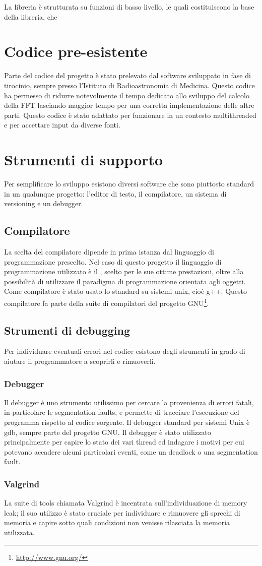 La libreria \`e strutturata su funzioni di basso livello, le quali costituiscono
la base della libreria, che 


\section{Codice pre-esistente}
Parte del codice del progetto \`e stato prelevato dal software sviluppato in
fase di tirocinio, sempre presso l'Istituto di Radioastronomia di Medicina.
Questo codice ha permesso di ridurre notevolmente il tempo dedicato allo
sviluppo del calcolo della \ac{FFT} lasciando maggior tempo per una corretta
implementazione delle altre parti. Questo codice \`e stato adattato per
funzionare in un contesto multithreaded e per accettare input da diverse fonti.

\section{Strumenti di supporto}
Per semplificare lo sviluppo esistono diversi software che sono piuttosto
standard in un qualunque progetto: l'editor di testo, il compilatore, un sistema
di versioning e un debugger.

\subsection{Compilatore}
La scelta del compilatore dipende in prima istanza dal linguaggio di
programmazione prescelto. Nel caso di questo progetto il linguaggio di
programmazione utilizzato \`e il \CC, scelto per le sue ottime prestazioni,
oltre alla possibilit\`a di utilizzare il paradigma di programmazione
orientata agli oggetti. Come compilatore \`e stato usato lo standard su sistemi
unix, cio\`e g++. Questo compilatore fa parte della suite di compilatori del
progetto GNU\footnote{\url{http://www.gnu.org/}}.

\subsection{Strumenti di debugging}
Per individuare eventuali errori nel codice esistono degli strumenti in grado di
aiutare il programmatore a scoprirli e rimuoverli.

\subsubsection{Debugger}
Il debugger \`e uno strumento utilissimo per cercare la provenienza di errori
fatali, in particolare le segmentation faults, e permette di tracciare
l'esecuzione del programma rispetto al codice sorgente. Il debugger standard per
sistemi Unix \`e gdb, sempre parte del progetto GNU. Il debugger \`e stato
utilizzato principalmente per capire lo stato dei vari thread ed indagare i
motivi per cui potevano accadere alcuni particolari eventi, come un deadlock o
una segmentation fault.

\subsubsection{Valgrind}
La suite di tools chiamata Valgrind \`e incentrata sull'individuazione di
memory leak; il suo utilizzo \`e stato cruciale per individuare e rimuovere gli
sprechi di memoria e capire sotto quali condizioni non venisse rilasciata la
memoria utilizzata.
